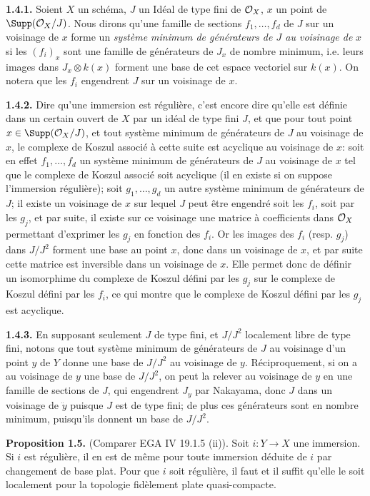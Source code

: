 \textbf{1.4.1.} Soient $X$ un schéma, $J$ un Idéal de type fini de $\mathcal O_X$, $x$ un point de $\Supp(\cO_X/J)$. Nous dirons qu'une famille de sections $f_1,\ldots,f_d$ de $J$ sur un voisinage de $x$ forme un \emph{système minimum de générateurs de $J$ au voisinage de} $x$ si les $(f_i)_x$ sont une famille de générateurs de $J_x$ de nombre minimum, i.e. leurs images dans $J_x\otimes k(x)$ forment une base de cet espace vectoriel sur $k(x)$. On notera que les $f_i$ engendrent $J$ sur un voisinage de $x$.

\textbf{1.4.2.} Dire qu'une immersion est régulière, c'est encore dire qu'elle est définie dans un certain ouvert de $X$ par un idéal de type fini $J$, et que pour tout point $x\in\Supp(\cO_X/J)$, et tout système minimum de générateurs de $J$ au voisinage de $x$, le complexe de Koszul associé à cette suite est acyclique au voisinage de $x$: soit en effet $f_1,\ldots,f_d$ un système minimum de
générateurs de $J$ au voisinage de $x$ tel que le complexe de Koszul associé soit acyclique (il en existe si on suppose l'immersion régulière); soit $g_1,\ldots,g_d$ un autre système minimum de générateurs de $J$; il existe un voisinage de $x$ sur lequel $J$ peut être engendré soit les $f_i$, soit par les $g_j$, et par suite, il existe sur ce voisinage une matrice à coefficients dans $\mathcal O_X$ permettant d'exprimer les $g_j$ en fonction des $f_i$. Or les images des $f_i$ (resp. $g_j$) dans $J/J^2$ forment une base au point $x$, donc dans un voisinage de $x$, et par suite cette matrice est inversible dans un voisinage de $x$. Elle permet donc de définir un isomorphime du complexe de Koszul défini par les $g_j$ sur le complexe de Koszul défini par les $f_i$, ce qui montre que le complexe de Koszul défini par les $g_j$ est acyclique.

\textbf{1.4.3.} En supposant seulement $J$ de type fini, et $J/J^2$ localement libre de type fini, notons que tout système minimum de générateurs de $J$ au voisinage d'un point $y$ de $Y$ donne une base de $J/J^2$ au voisinage de $y$. Réciproquement, si on a au voisinage de $y$ une base de $J/J^2$, on peut la relever au voisinage de $y$ en une famille de sections de $J$, qui engendrent $J_y$ par Nakayama, donc $J$ dans un voisinage de $\ddot y$ puisque $J$ est de type fini; de plus ces générateurs sont en nombre minimum, puisqu'ils donnent un base de $J/J^2$.

\textbf{Proposition 1.5.} (Comparer EGA IV 19.1.5 (ii)). Soit $i:Y\longrightarrow X$ une immersion. Si $i$ est régulière, il en est de même pour toute immersion déduite de $i$ par changement de base plat. Pour que $i$ soit régulière, il faut et il suffit qu'elle le soit localement pour la topologie fidèlement plate quasi-compacte.

